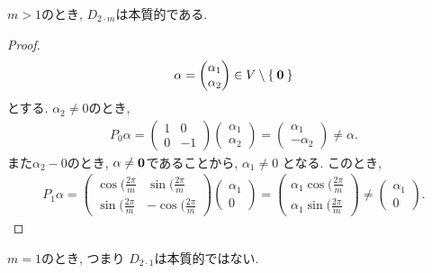 \begin{prop}
$m>1$のとき, $D_{2\cdot m}$は本質的である.
\end{prop}
\begin{proof}
  \begin{align*}
    \alpha=\begin{pmatrix}
      \alpha_1 \\
      \alpha_2
    \end{pmatrix}\in V\setminus\Set{\boldsymbol{0}}
  \end{align*}
  とする.
  $\alpha_2\neq 0$のとき,
  \begin{align*}
    P_0 \alpha =
    \begin{pmatrix}
      1&0\\
      0&-1
    \end{pmatrix}  
    \begin{pmatrix}
      \alpha_1\\
      \alpha_2
    \end{pmatrix}
    =
    \begin{pmatrix}
      \alpha_1\\
      -\alpha_2
    \end{pmatrix}
    \neq \alpha.
  \end{align*}
  また$\alpha_2-0$のとき,
  $\alpha\neq \boldsymbol{0}$であることから,
  $\alpha_1\neq 0$ となる.
  このとき,
  \begin{align*}
    P_1 \alpha =
    \begin{pmatrix}
      \cos(\frac{2\pi}{m}&\sin(\frac{2\pi}{m}\\
      \sin(\frac{2\pi}{m}&-\cos(\frac{2\pi}{m}
    \end{pmatrix}  
    \begin{pmatrix}
      \alpha_1\\
      0
    \end{pmatrix}
    =
    \begin{pmatrix}
      \alpha_1\cos(\frac{2\pi}{m}\\
      \alpha_1\sin(\frac{2\pi}{m}
    \end{pmatrix}  
    \neq
    \begin{pmatrix}
      \alpha_1\\
      0
    \end{pmatrix}
    .
  \end{align*}
\end{proof}
\begin{prop}
  $m=1$のとき, つまり $D_{2\cdot 1}$は本質的ではない.
\end{prop}

